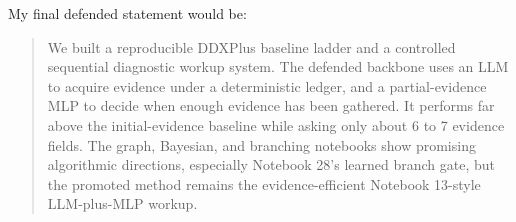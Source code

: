 \documentclass[11pt]{article}
\begin{document}
My final defended statement would be:

\begin{quote}
We built a reproducible DDXPlus baseline ladder and a controlled sequential diagnostic workup system. The defended backbone uses an LLM to acquire evidence under a deterministic ledger, and a partial-evidence MLP to decide when enough evidence has been gathered. It performs far above the initial-evidence baseline while asking only about 6 to 7 evidence fields. The graph, Bayesian, and branching notebooks show promising algorithmic directions, especially Notebook 28's learned branch gate, but the promoted method remains the evidence-efficient Notebook 13-style LLM-plus-MLP workup.
\end{quote}
\end{document}
